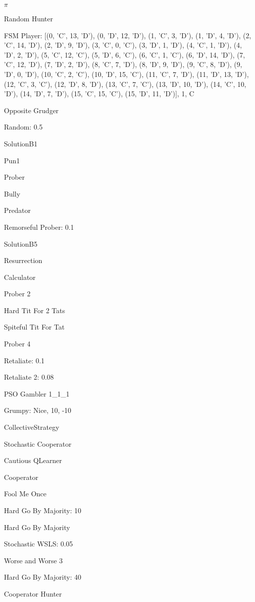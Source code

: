 \item $\pi$
\item Random Hunter
\item FSM Player: [(0, 'C', 13, 'D'), (0, 'D', 12, 'D'), (1, 'C', 3, 'D'), (1, 'D', 4, 'D'), (2, 'C', 14, 'D'), (2, 'D', 9, 'D'), (3, 'C', 0, 'C'), (3, 'D', 1, 'D'), (4, 'C', 1, 'D'), (4, 'D', 2, 'D'), (5, 'C', 12, 'C'), (5, 'D', 6, 'C'), (6, 'C', 1, 'C'), (6, 'D', 14, 'D'), (7, 'C', 12, 'D'), (7, 'D', 2, 'D'), (8, 'C', 7, 'D'), (8, 'D', 9, 'D'), (9, 'C', 8, 'D'), (9, 'D', 0, 'D'), (10, 'C', 2, 'C'), (10, 'D', 15, 'C'), (11, 'C', 7, 'D'), (11, 'D', 13, 'D'), (12, 'C', 3, 'C'), (12, 'D', 8, 'D'), (13, 'C', 7, 'C'), (13, 'D', 10, 'D'), (14, 'C', 10, 'D'), (14, 'D', 7, 'D'), (15, 'C', 15, 'C'), (15, 'D', 11, 'D')], 1, C
\item Opposite Grudger
\item Random: 0.5
\item SolutionB1
\item Pun1
\item Prober
\item Bully
\item Predator
\item Remorseful Prober: 0.1
\item SolutionB5
\item Resurrection
\item Calculator
\item Prober 2
\item Hard Tit For 2 Tats
\item Spiteful Tit For Tat
\item Prober 4
\item Retaliate: 0.1
\item Retaliate 2: 0.08
\item PSO Gambler 1\_1\_1
\item Grumpy: Nice, 10, -10
\item CollectiveStrategy
\item Stochastic Cooperator
\item Cautious QLearner
\item Cooperator
\item Fool Me Once
\item Hard Go By Majority: 10
\item Hard Go By Majority
\item Stochastic WSLS: 0.05
\item Worse and Worse 3
\item Hard Go By Majority: 40
\item Cooperator Hunter
